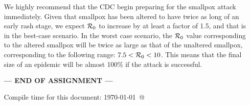 \documentclass[12pt]{article}\usepackage[]{graphicx}\usepackage[]{color}
\begin{document}
\begin{enumerate}[(a)]
{\color{blue} {
We highly recommend that the CDC begin preparing for the smallpox attack immediately. Given that smallpox has been altered to have twice as long of an early rash stage, we expect ${\cal R}_0$ to increase by at least a factor of 1.5, and that is in the best-case scenario. In the worst case scenario, the ${\cal R}_0$ value corresponding to the altered smallpox will be twice as large as that of the unaltered smallpox, corresponding to the following range: $7.5 < {\cal R}_0 < 10$.
This means that the final size of an epidemic will be almost 100\% if the attack is successful.
}}

\end{enumerate}

\smpxnathistfig

\bigskip
\centerline{\bf--- END OF ASSIGNMENT ---}

\bigskip
Compile time for this document:
\today\ @ \thistime
\end{document}
